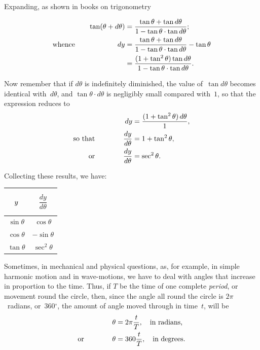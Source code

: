 \documentclass[12pt,openany]{book}%
\providecommand{\U}[1]{\protect\rule{.1in}{.1in}}
\begin{document}
Expanding, as shown in books on trigonometry%

\begin{align*}
\tan(\theta+d\theta)  &  =\frac{\tan\theta+\tan d\theta}{1-\tan\theta\cdot\tan
d\theta};\\
\text{whence\qquad\qquad\qquad}dy  &  =\frac{\tan\theta+\tan d\theta}%
{1-\tan\theta\cdot\tan d\theta}-\tan\theta\\
&  =\frac{(1+\tan^{2}\theta)\tan d\theta}{1-\tan\theta\cdot\tan d\theta}.
\end{align*}


Now remember that if $d\theta$ is indefinitely diminished, the value of~$\tan
d\theta$ becomes identical with~$d\theta$, and $\tan\theta\cdot d\theta$ is
negligibly small compared with~$1$, so that the expression reduces to
\begin{align*}
dy  &  = \frac{(1+\tan^{2} \theta)\, d\theta}{1},\\
\text{so that\qquad\qquad} \frac{dy}{d\theta}  &  = 1 + \tan^{2}\theta,\\
\text{or\qquad\qquad} \frac{dy}{d\theta}  &  = \sec^{2} \theta.
\end{align*}


Collecting these results, we have:

\begin{center}%
\begin{tabular}
[c]{|c|c|}\hline
$\rule[-12pt]{0pt}{32pt}y$ & $\dfrac{dy}{d\theta}$\\\hline
$\sin\theta$ & $\cos\theta$\\
$\cos\theta$ & $-\sin\theta$\\
$\tan\theta$ & $\sec^{2}\theta$\\\hline
\end{tabular}



\end{center}

Sometimes, in mechanical and physical questions, as, for example, in simple
harmonic motion and in wave-motions, we have to deal with angles that increase
in proportion to the time. Thus, if $T$ be the time of one complete
\emph{period}, or movement round the circle, then, since the angle all round
the circle is $2\pi$~radians, or~$360%
{{}^\circ}%
$, the amount of angle moved through in time~$t$, will be
\begin{align*}
\theta &  = 2\pi\frac{t}{T},\quad\text{in radians,}\\
\text{or\qquad\qquad} \theta &  = 360\frac{t}{T},\quad\text{in degrees.}%
\end{align*}
\end{document}
